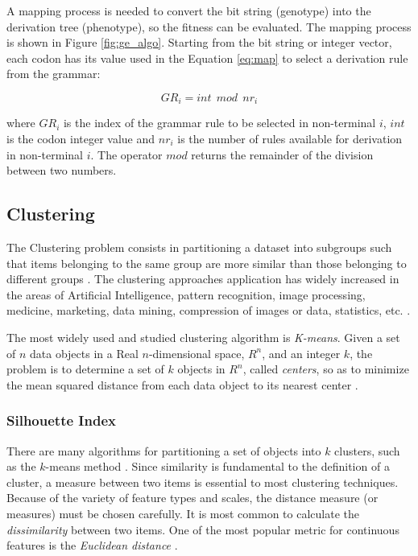 \documentclass[journal]{IEEEtran}
\begin{document}
	A mapping process is needed to convert the bit string (genotype) into the derivation tree (phenotype), so the fitness can be evaluated. The mapping process is shown in Figure \ref{fig:ge_algo}. Starting from the bit string or integer vector, each codon has its value used in the Equation \ref{eq:map} to select a derivation rule from the grammar:
	
	\begin{equation}\label{eq:map}
	GR_i = int~~mod~~nr_i
	\end{equation}
	
	where $GR_i$ is the index of the grammar rule to be selected in non-terminal $i$, $int$ is the codon integer value and $nr_i$ is the number of rules available for derivation in non-terminal $i$. The operator $mod$ returns the remainder of the division between two numbers.
	
	\subsection{Clustering}
	
	The Clustering problem consists in partitioning a dataset into subgroups such that items belonging to the same group are more similar than those belonging to different groups \cite{boric2007genetic} \cite{ahalya2015data}. The clustering approaches application has widely increased in the areas of Artificial Intelligence, pattern recognition, image processing, medicine, marketing, data mining, compression of images or data, statistics, etc. \cite{ahalya2015data}.
	
	The most widely used and studied clustering algorithm is \textit{K-means}. Given a set of $n$ data objects in a Real $n$-dimensional space, $R^n$, and an integer $k$, the problem is to determine a set of $k$ objects in $R^n$, called \textit{centers}, so as to minimize the mean squared distance from each data object to its nearest center \cite{kanungo2002efficient}.
	
	
	\subsubsection{Silhouette Index}
	\label{sec:sillhouetteIndex}
	
	There are many algorithms for partitioning a set of objects into $k$ clusters, such as the $k$-means method \cite{kanungo2002efficient}. Since similarity is fundamental to the definition of a cluster, a measure between two items is essential to most clustering techniques. Because of the variety of feature types and scales, the distance measure (or measures) must be chosen carefully. It is most common to calculate the \textit{dissimilarity} between two items. One of the most popular metric for continuous features is the \textit{Euclidean distance} \cite{jain1988algorithms}.
	
\end{document}
